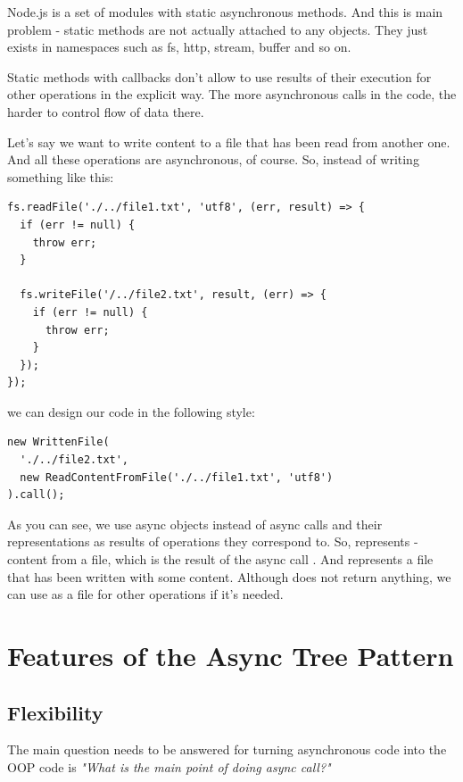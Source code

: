 \documentclass{article}
\newcommand{\cit}[1]{{\fontfamily{qcr}\selectfont{\textcolor{superdarkgray}{#1}}}}
\begin{document}
Node.js is a set of modules with static asynchronous methods. And this is main problem - static methods are not actually attached to any objects. They just exists in namespaces such as fs, http, stream, buffer and so on.

Static methods with callbacks don't allow to use results of their execution for other operations in the explicit way. The more asynchronous calls in the code, the harder to control flow of data there.

Let's say we want to write content to a file that has been read from another one. And all these operations are asynchronous, of course. 
So, instead of writing something like this:

\begin{lstlisting}
fs.readFile('./../file1.txt', 'utf8', (err, result) => {
  if (err != null) {
    throw err;
  }
 
  fs.writeFile('/../file2.txt', result, (err) => {
    if (err != null) {
      throw err;
    }
  });
});
\end{lstlisting}

we can design our code in the following style:

\begin{lstlisting}
new WrittenFile(
  './../file2.txt',
  new ReadContentFromFile('./../file1.txt', 'utf8')
).call();
\end{lstlisting}

As you can see, we use async objects instead of async calls and their representations as results of operations they correspond to. So, \cit{ReadContentFromFile} represents \cit{string} - content from a file, which is the result of the async call \cit{fs.readFile}. And \cit{WrittenFile} represents a file that has been written with some content. Although \cit{fs.WriteFile} does not return anything, we can use \cit{WrittenFile} as a file for other operations if it's needed.

\section{Features of the Async Tree Pattern}

\subsection{Flexibility}

The main question needs to be answered for turning asynchronous code into the OOP code is \textit{"What is the main point of doing async call?"}
\end{document}
